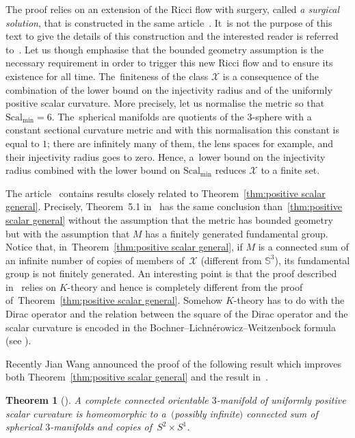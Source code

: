 \documentclass[pdftex]{sigma}
\numberwithin{equation}{section}
\newtheorem{theor}{Theorem}[section]
\def\Smin{\textrm{Scal}_\mathrm{min}}
\begin{document}
The proof relies on an extension of the Ricci flow with surgery, called {\it a surgical solution}, that is constructed in the same article~\cite{BBM}. It~is not the purpose of this text to give the details of this construction and the interested reader is referred to~\cite{BBM}. Let us though emphasise that the bounded geometry assumption is the necessary requirement in order to trigger this new Ricci flow and to ensure its existence for all time. The~finiteness of the class $\mathcal X$ is a consequence
of the combination of the lower bound on the injectivity radius and of the uniformly positive scalar curvature. More precisely, let us normalise the metric so that $\Smin = 6$. The~spherical manifolds are quotients of the $3$-sphere with a constant sectional curvature metric and with this
normalisation this constant is equal to $1$; there are infinitely many of
them, the lens spaces for example, and their injectivity radius goes to zero. Hence, a~lower bound on the injectivity radius combined with the lower bound on $\Smin$ reduces $\mathcal X$ to a finite set.

The article~\cite{cwy:taming} contains results closely related to Theorem~\ref{thm:positive scalar general}. Precisely, Theorem~5.1 in~\cite{cwy:taming} has the same conclusion than~\ref{thm:positive scalar general} without the assumption that the metric has bounded geometry but with the assumption that $M$ has a finitely generated fundamental group. Notice that, in~Theorem~\ref{thm:positive scalar general}, if $M$ is a connected sum of
an infinite number of copies of members of~$\mathcal X$ (different from $\mathbb{S}^3$), its fundamental group is not finitely generated. An interesting point is that the proof described in~\cite{cwy:taming} relies on $K$-theory and hence is completely different from the proof of~Theorem~\ref{thm:positive scalar general}. Somehow $K$-theory has to do with the Dirac operator and the relation between the square of the Dirac operator and
the scalar curvature is encoded in the Bochner--Lichn\'erowicz--Weitzenbock formula (see \cite[equation~(2.14), p.~112]{GromovLawson}).

Recently Jian Wang announced the proof of the following result which improves both Theorem~\ref{thm:positive scalar general} and the result in~\cite{cwy:taming}.

\begin{theor}[\cite{Wang3}]\label{Wang3}
A complete connected orientable $3$-manifold of uniformly positive scalar
curvature is homeomorphic to a~$($possibly infinite$)$ connected sum of spherical $3$-manifolds and copies of~$S^2\times S^1$.
\end{theor}
\end{document}
